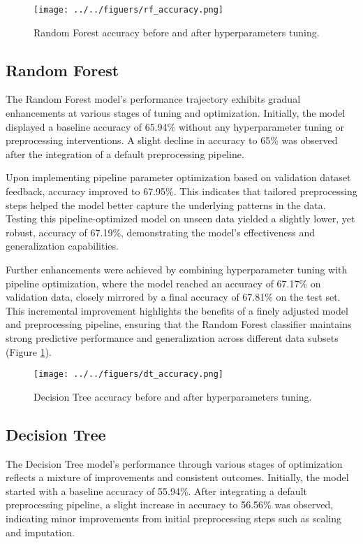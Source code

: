 \documentclass[
	letterpaper, %
	12pt, %
	unnumberedsections, %
	twoside, %
]{LTJournalArticle}
\begin{document}
\begin{figure}
	\texttt{[image: ../../figuers/rf\_accuracy.png]}
	\caption{Random Forest accuracy before and after hyperparameters tuning.}
	\label{fig:rf_accuracy}

\end{figure}
\subsection{Random Forest}
The Random Forest model's performance trajectory exhibits gradual enhancements at various stages of tuning and optimization. Initially, the model displayed a baseline accuracy of 65.94\% without any hyperparameter tuning or preprocessing interventions. A slight decline in accuracy to 65\% was observed after the integration of a default preprocessing pipeline.

Upon implementing pipeline parameter optimization based on validation dataset feedback, accuracy improved to 67.95\%. This indicates that tailored preprocessing steps helped the model better capture the underlying patterns in the data. Testing this pipeline-optimized model on unseen data yielded a slightly lower, yet robust, accuracy of 67.19\%, demonstrating the model's effectiveness and generalization capabilities.

Further enhancements were achieved by combining hyperparameter tuning with pipeline optimization, where the model reached an accuracy of 67.17\% on validation data, closely mirrored by a final accuracy of 67.81\% on the test set. This incremental improvement highlights the benefits of a finely adjusted model and preprocessing pipeline, ensuring that the Random Forest classifier maintains strong predictive performance and generalization across different data subsets (Figure \ref{fig:rf_accuracy}).

\begin{figure}
	\texttt{[image: ../../figuers/dt\_accuracy.png]}
	\caption{Decision Tree accuracy before and after hyperparameters tuning.}
	\label{fig:dt_accuracy}
\end{figure}
\subsection{Decision Tree}
The Decision Tree model's performance through various stages of optimization reflects a mixture of improvements and consistent outcomes. Initially, the model started with a baseline accuracy of 55.94\%. After integrating a default preprocessing pipeline, a slight increase in accuracy to 56.56\% was observed, indicating minor improvements from initial preprocessing steps such as scaling and imputation.
\end{document}
